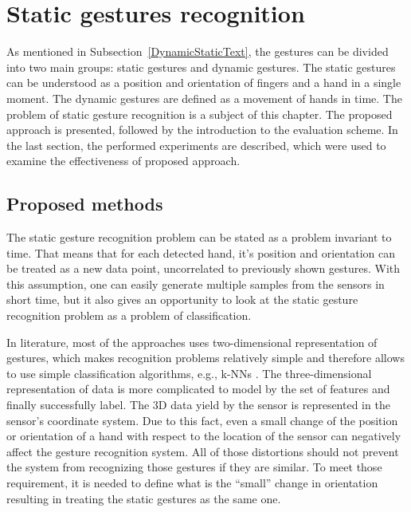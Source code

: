
\chapter{Static gestures recognition}\label{staticChapter}

As mentioned in Subsection~\ref{DynamicStaticText}, the gestures can be divided into two main groups: static gestures and dynamic gestures.
The static gestures can be understood as a position and orientation of fingers and a hand in a single moment. The dynamic gestures are defined as a movement of hands in time. 
The problem of static gesture recognition is a subject of this chapter. 
The proposed approach is presented, followed by the introduction to the evaluation scheme. 
In the last section, the performed experiments are described, which were used to examine the effectiveness of proposed approach.

\section{Proposed methods}

The static gesture recognition problem can be stated as a problem invariant to time.
That means that for each detected hand, it's position and orientation can be treated as a new data point, uncorrelated to previously shown gestures.
With this assumption, one can easily generate multiple samples from the sensors in short time, but it also gives an opportunity to look at the static gesture recognition problem as a problem of classification.

In literature, most of the approaches uses two-dimensional representation of gestures, which makes recognition problems relatively simple and therefore allows to use simple classification algorithms, e.g., k-NNs \cite{gestureRecognitionToolbox}. 
The three-dimensional representation of data is more complicated to model by the set of features and finally successfully label.
The 3D data yield by the sensor is represented in the sensor's coordinate system. 
Due to this fact, even a small change of the position or orientation of a hand with respect to the location of the sensor can negatively affect the gesture recognition system.
All of those distortions should not prevent the system from recognizing those gestures if they are similar.
To meet those requirement, it is needed to define what is the ``small'' change in orientation resulting in treating the static gestures as the same one.

